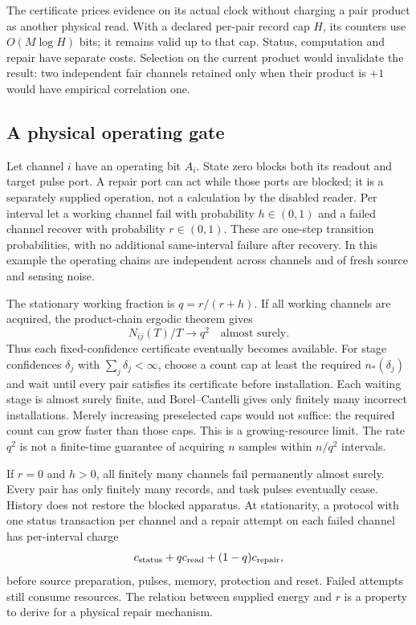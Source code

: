 \documentclass[11pt]{article}
\theoremstyle{definition}
\theoremstyle{remark}
\begin{document}
The certificate prices evidence on its actual clock without charging a pair product as another physical read. With a declared per-pair record cap $H$, its counters use $O(M\log H)$ bits; it remains valid up to that cap. Status, computation and repair have separate costs. Selection on the current product would invalidate the result: two independent fair channels retained only when their product is $+1$ would have empirical correlation one.

\subsection{A physical operating gate}

Let channel $i$ have an operating bit $A_i$. State zero blocks both its readout and target pulse port. A repair port can act while those ports are blocked; it is a separately supplied operation, not a calculation by the disabled reader. Per interval let a working channel fail with probability $h\in(0,1)$ and a failed channel recover with probability $r\in(0,1)$. These are one-step transition probabilities, with no additional same-interval failure after recovery. In this example the operating chains are independent across channels and of fresh source and sensing noise.

The stationary working fraction is $q=r/(r+h)$. If all working channels are acquired, the product-chain ergodic theorem gives
\begin{equation}\label{eq:pairthroughput}
 N_{ij}(T)/T\longrightarrow q^2\quad\text{almost surely}.
\end{equation}
Thus each fixed-confidence certificate eventually becomes available. For stage confidences $\delta_j$ with $\sum_j\delta_j<\infty$, choose a count cap at least the required $n_*(\delta_j)$ and wait until every pair satisfies its certificate before installation. Each waiting stage is almost surely finite, and Borel--Cantelli gives only finitely many incorrect installations. Merely increasing preselected caps would not suffice: the required count can grow faster than those caps. This is a growing-resource limit. The rate $q^2$ is not a finite-time guarantee of acquiring $n$ samples within $n/q^2$ intervals.

If $r=0$ and $h>0$, all finitely many channels fail permanently almost surely. Every pair has only finitely many records, and task pulses eventually cease. History does not restore the blocked apparatus. At stationarity, a protocol with one status transaction per channel and a repair attempt on each failed channel has per-interval charge
\[
 c_{\rm status}+q c_{\rm read}+(1-q)c_{\rm repair},
\]
before source preparation, pulses, memory, protection and reset. Failed attempts still consume resources. The relation between supplied energy and $r$ is a property to derive for a physical repair mechanism.
\end{document}
